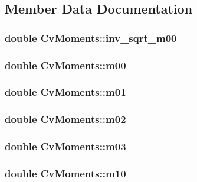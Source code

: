 \subsection{Member Data Documentation}
\hypertarget{structCvMoments_ad08a81f43610187c2e0c430cb13f24ae}{
\subsubsection[{inv\-\_\-sqrt\-\_\-m00}]{\setlength{\rightskip}{0pt plus 5cm}double Cv\-Moments\-::inv\-\_\-sqrt\-\_\-m00}}\label{structCvMoments_ad08a81f43610187c2e0c430cb13f24ae}
\hypertarget{structCvMoments_af8990a23161b5e58cf5823a1ea824b58}{
\subsubsection[{m00}]{\setlength{\rightskip}{0pt plus 5cm}double Cv\-Moments\-::m00}}\label{structCvMoments_af8990a23161b5e58cf5823a1ea824b58}
\hypertarget{structCvMoments_a7ebd6af845050990ceda665a685e95c4}{
\subsubsection[{m01}]{\setlength{\rightskip}{0pt plus 5cm}double Cv\-Moments\-::m01}}\label{structCvMoments_a7ebd6af845050990ceda665a685e95c4}
\hypertarget{structCvMoments_ad6733062576919dac6c2c7f1d6f55fbd}{
\subsubsection[{m02}]{\setlength{\rightskip}{0pt plus 5cm}double Cv\-Moments\-::m02}}\label{structCvMoments_ad6733062576919dac6c2c7f1d6f55fbd}
\hypertarget{structCvMoments_a5da611e29d5c86cb34cfc99a288fb60d}{
\subsubsection[{m03}]{\setlength{\rightskip}{0pt plus 5cm}double Cv\-Moments\-::m03}}\label{structCvMoments_a5da611e29d5c86cb34cfc99a288fb60d}
\hypertarget{structCvMoments_a2ecba768610f42190605fb63f63bc12e}{
\subsubsection[{m10}]{\setlength{\rightskip}{0pt plus 5cm}double Cv\-Moments\-::m10}}\label{structCvMoments_a2ecba768610f42190605fb63f63bc12e}

